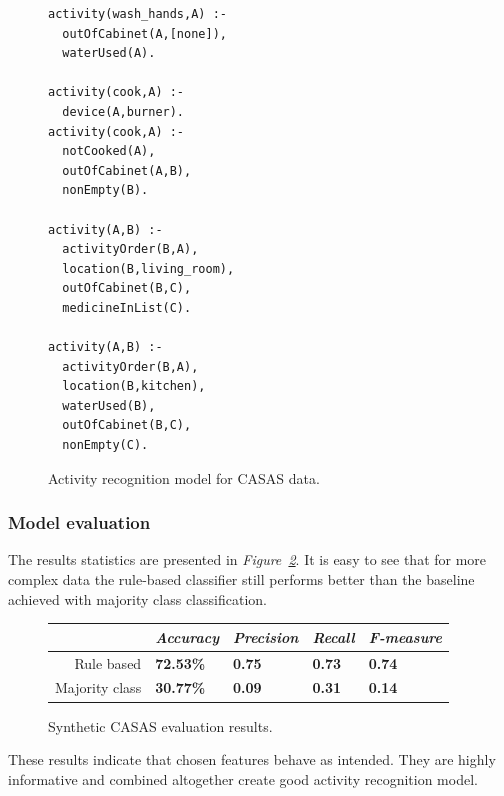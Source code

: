 \documentclass[10pt, a4paper, pdflatex, leqno, twoside, openright]{report}
\begin{document}
\begin{figure}[htb]
  \begin{verbatim}
activity(wash_hands,A) :-
  outOfCabinet(A,[none]),
  waterUsed(A).

activity(cook,A) :-
  device(A,burner).
activity(cook,A) :-
  notCooked(A),
  outOfCabinet(A,B),
  nonEmpty(B).

activity(A,B) :-
  activityOrder(B,A),
  location(B,living_room),
  outOfCabinet(B,C),
  medicineInList(C).

activity(A,B) :-
  activityOrder(B,A),
  location(B,kitchen),
  waterUsed(B),
  outOfCabinet(B,C),
  nonEmpty(C).
  \end{verbatim}
  \caption{Activity recognition model for CASAS data.\label{lst:CASASmodel}}
\end{figure}

      \subsubsection{Model evaluation}
The results statistics are presented in \emph{Figure~\ref{tab:synthCASASstats}}. It is easy to see that for more complex data the rule-based classifier still performs better than the baseline achieved with majority class classification.\\

\begin{figure}[htb]
  \centering
  \begin{tabular}{ r | l l l l }
  & \emph{Accuracy} & \emph{Precision} & \emph{Recall} & \emph{F-measure}\\
\hline
Rule based & \textbf{72.53\%} & \textbf{0.75} & \textbf{0.73} & \textbf{0.74}\\
Majority class & \textbf{30.77\%} & \textbf{0.09} & \textbf{0.31} & \textbf{0.14}\\
  \end{tabular}
  \caption{Synthetic CASAS evaluation results.\label{tab:synthCASASstats}} %
\end{figure}

These results indicate that chosen features behave as intended. They are highly informative and combined altogether create good activity recognition model.
\end{document}
